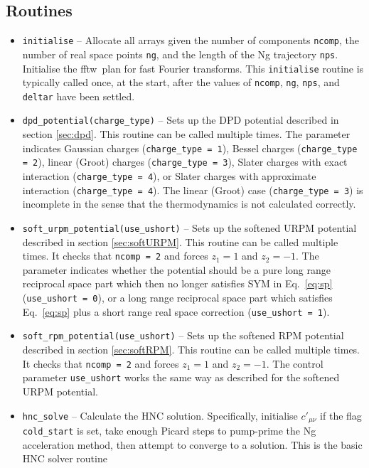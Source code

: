 \documentclass[12pt,a4paper]{article}
\newcommand{\Eqref}[1]{Eq.~\eqref{#1}}
\newcommand{\FFTW}{{\sc fftw}}
\begin{document}
\subsection{Routines}
%
\begin{itemize}
%
\item\verb+initialise+ -- Allocate all arrays given the number of
  components \verb+ncomp+, the number of real space points \verb+ng+,
  and the length of the Ng trajectory \verb+nps+.  Initialise the
  \FFTW\ plan for fast Fourier transforms.  This \verb+initialise+
  routine is typically called once, at the start, after the values of
  \verb+ncomp+, \verb+ng+, \verb+nps+, and \verb+deltar+ have been
  settled.
%
\item\verb+dpd_potential(charge_type)+ -- Sets up the DPD potential
  described in section \ref{sec:dpd}.  This routine can be called
  multiple times.  The parameter indicates Gaussian charges
  (\verb+charge_type = 1+), Bessel charges (\verb+charge_type = 2+),
  linear (Groot) charges (\verb+charge_type = 3+), Slater charges with
  exact interaction (\verb+charge_type = 4+), or Slater charges with
  approximate interaction (\verb+charge_type = 4+).  The linear
  (Groot) case (\verb+charge_type = 3+) is incomplete in the sense
  that the thermodynamics is not calculated correctly.
%
\item\verb+soft_urpm_potential(use_ushort)+ -- Sets up the
  softened URPM potential described in section \ref{sec:softURPM}.
  This routine can be called multiple times.  It checks that
  \verb+ncomp = 2+ and forces $z_1=1$ and $z_2=-1$.  The parameter
  indicates whether the potential should be a pure long range
  reciprocal space part which then no longer satisfies SYM in
  \Eqref{eq:sp} (\verb+use_ushort = 0+), or a long range
  reciprocal space part which satisfies \Eqref{eq:sp} plus a short
  range real space correction (\verb+use_ushort = 1+).
%
\item\verb+soft_rpm_potential(use_ushort)+ -- Sets up the softened RPM
  potential described in section \ref{sec:softRPM}.  This routine can
  be called multiple times.  It checks that \verb+ncomp = 2+ and
  forces $z_1=1$ and $z_2=-1$.  The control parameter
  \verb+use_ushort+ works the same way as described for the softened
  URPM potential.
%
\item\verb+hnc_solve+ -- Calculate the HNC solution.  Specifically,
  initialise $c'_{\mu\nu}$ if the flag \verb+cold_start+ is set, take
  enough Picard steps to pump-prime the Ng acceleration method, then
  attempt to converge to a solution.  This is the basic HNC solver routine

\end{itemize}
\end{document}
